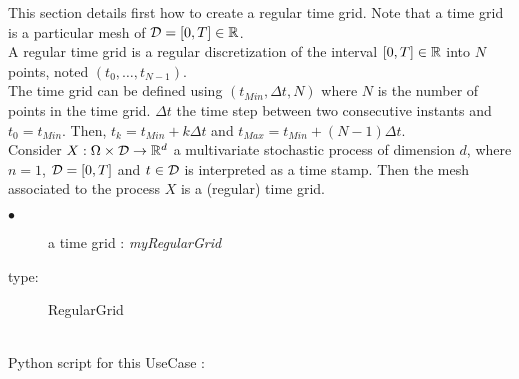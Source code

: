 \renewcommand{\filename}{docUC_RegularGrid.tex}
\renewcommand{\filetitle}{UC : Creation of a time grid}

\HeaderIILevel

\label{UCtimeGrig}




This section details first how to create a regular time grid. Note that a time grid is a particular mesh of ${\mathcal D}=[0,T] \in {\mathbb R}$.\\


A regular time grid is a regular discretization of the interval $[0, T] \in {\mathbb R}$ into $N$ points, noted $(t_0, \hdots, t_{N-1})$.\\

The time grid can be defined using $(t_{Min}, \Delta t, N)$ where $N$ is the number of points in the time grid. $\Delta t$ the time step between two consecutive instants and $t_0 = t_{Min}$. Then,  $t_k = t_{Min} + k \Delta t$ and $t_{Max} = t_{Min} +  (N-1) \Delta t$.\\


Consider $X: \Omega \times {\mathcal D} \rightarrow {\mathbb R}^d$ a multivariate stochastic process of dimension $d$,  where $n=1$, ${\mathcal D}=[0,T]$ and $t\in {\mathcal D}$ is interpreted as a time stamp. Then the mesh associated to the process $X$ is a (regular) time grid.\\


{
  \begin{description}
  \item[$\bullet$] a time grid : {\itshape myRegularGrid}
  \item[type:]  RegularGrid
  \end{description}
}

\textspace\\
Python script for this UseCase :

